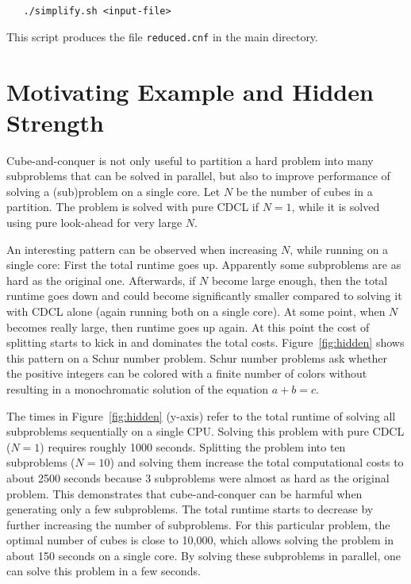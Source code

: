 \documentclass{llncs}
\begin{document}
\begin{verbatim}
   ./simplify.sh <input-file>
\end{verbatim}

This script produces the file {\tt reduced.cnf} in the main directory.

\section{Motivating Example and Hidden Strength}

Cube-and-conquer is not only useful to partition a hard problem into many subproblems that can be solved in parallel, 
but also to improve performance of solving a (sub)problem on a single core. Let $N$ be the number of cubes in a partition. 
The problem is solved with pure CDCL if $N=1$, while it is solved
using pure look-ahead for very large $N$.

An interesting pattern can be observed when increasing $N$, while running on a single core: First the total runtime goes up. 
Apparently some subproblems are as hard as the original one. Afterwards, if $N$ become large enough, then the total runtime goes down and could become 
significantly smaller compared to solving it with CDCL alone (again running both on a single core). At some point, when
$N$ becomes really large, then runtime goes up again. At this point the cost of splitting starts to kick in and dominates 
the total costs.
Figure~\ref{fig:hidden} shows this pattern on a Schur number problem. Schur number problems ask whether
the positive integers can be colored with a finite number of colors without resulting in a monochromatic solution of the equation
$a  + b = c$.

The times in Figure~\ref{fig:hidden} (y-axis) refer to the total runtime of solving all subproblems sequentially on a single CPU.
Solving this problem with pure CDCL ($N=1$) requires roughly 1000 seconds. Splitting the problem into ten subproblems ($N=10$)
and solving them increase the total computational costs to about 2500 seconds because 3 subproblems were almost as hard as the 
original problem. This demonstrates that cube-and-conquer can be harmful when generating only a few subproblems.
The total runtime starts to decrease by further increasing the number of subproblems. For this particular problem, the optimal 
number of cubes is close to 10,000, which allows solving the problem in about 150 seconds on a single core. By solving these 
subproblems in parallel, one can solve this problem in a few seconds. 
\end{document}
